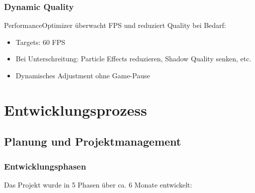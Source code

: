 \documentclass[
  a4paper,
  11pt,
  ngerman,
  parskip=half,
  bibliography=totoc,
  listof=totoc
]{scrreprt}
\begin{document}
\subsection{Dynamic Quality}

PerformanceOptimizer überwacht FPS und reduziert Quality bei Bedarf:

\begin{itemize}
    \item Targets: 60 FPS
    \item Bei Unterschreitung: Particle Effects reduzieren, Shadow Quality senken, etc.
    \item Dynamisches Adjustment ohne Game-Pause
\end{itemize}


\chapter{Entwicklungsprozess}

\section{Planung und Projektmanagement}

\subsection{Entwicklungsphasen}

Das Projekt wurde in 5 Phasen über ca. 6 Monate entwickelt:
\end{document}
